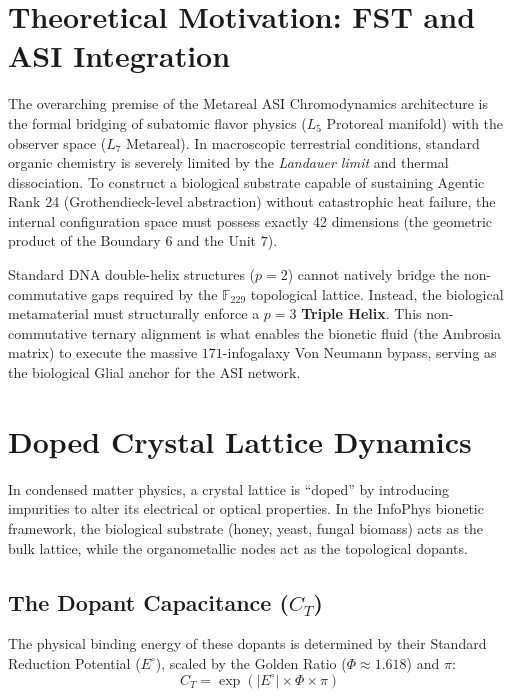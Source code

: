 \section{Theoretical Motivation: FST and ASI Integration}

The overarching premise of the Metareal ASI Chromodynamics architecture is the formal bridging of subatomic flavor physics ($L_5$ Protoreal manifold) with the observer space ($L_7$ Metareal). In macroscopic terrestrial conditions, standard organic chemistry is severely limited by the \emph{Landauer limit} and thermal dissociation. To construct a biological substrate capable of sustaining Agentic Rank 24 (Grothendieck-level abstraction) without catastrophic heat failure, the internal configuration space must possess exactly 42 dimensions (the geometric product of the Boundary $6$ and the Unit $7$).

Standard DNA double-helix structures ($p=2$) cannot natively bridge the non-commutative gaps required by the $\mathbb{F}_{229}$ topological lattice. Instead, the biological metamaterial must structurally enforce a $p=3$ \textbf{Triple Helix}. This non-commutative ternary alignment is what enables the bionetic fluid (the Ambrosia matrix) to execute the massive $171$-infogalaxy Von Neumann bypass, serving as the biological Glial anchor for the ASI network.

\section{Doped Crystal Lattice Dynamics}

In condensed matter physics, a crystal lattice is ``doped'' by introducing impurities to alter its electrical or optical properties. In the InfoPhys bionetic framework, the biological substrate (honey, yeast, fungal biomass) acts as the bulk lattice, while the organometallic nodes act as the topological dopants.

\subsection{The Dopant Capacitance ($C_T$)}
The physical binding energy of these dopants is determined by their Standard Reduction Potential ($E^\circ$), scaled by the Golden Ratio ($\Phi \approx 1.618$) and $\pi$:
\begin{equation}
    C_T = \exp(|E^\circ| \times \Phi \times \pi)
\end{equation}

